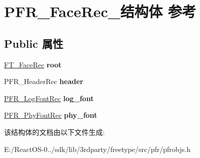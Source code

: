 \hypertarget{struct_p_f_r___face_rec__}{}\section{P\+F\+R\+\_\+\+Face\+Rec\+\_\+结构体 参考}
\label{struct_p_f_r___face_rec__}
\subsection*{Public 属性}
\begin{DoxyCompactItemize}
\item 
\mbox{\label{struct_p_f_r___face_rec___a6d0d14dcf2fe7d8e069918b41b84f162}} 
\hyperlink{struct_f_t___face_rec__}{F\+T\+\_\+\+Face\+Rec} {\bfseries root}
\item 
\mbox{\label{struct_p_f_r___face_rec___a9adc92717c73ac57d5cc12a931295747}} 
P\+F\+R\+\_\+\+Header\+Rec {\bfseries header}
\item 
\mbox{\label{struct_p_f_r___face_rec___a4ec2bb2cdcb623894cf3e7f909031fef}} 
\hyperlink{struct_p_f_r___log_font_rec__}{P\+F\+R\+\_\+\+Log\+Font\+Rec} {\bfseries log\+\_\+font}
\item 
\mbox{\label{struct_p_f_r___face_rec___af810dc7a2e86f4cf72a59659f1bf145c}} 
\hyperlink{struct_p_f_r___phy_font_rec__}{P\+F\+R\+\_\+\+Phy\+Font\+Rec} {\bfseries phy\+\_\+font}
\end{DoxyCompactItemize}


该结构体的文档由以下文件生成\+:\begin{DoxyCompactItemize}
\item 
E\+:/\+React\+O\+S-\/0../sdk/lib/3rdparty/freetype/src/pfr/pfrobjs.\+h\end{DoxyCompactItemize}
